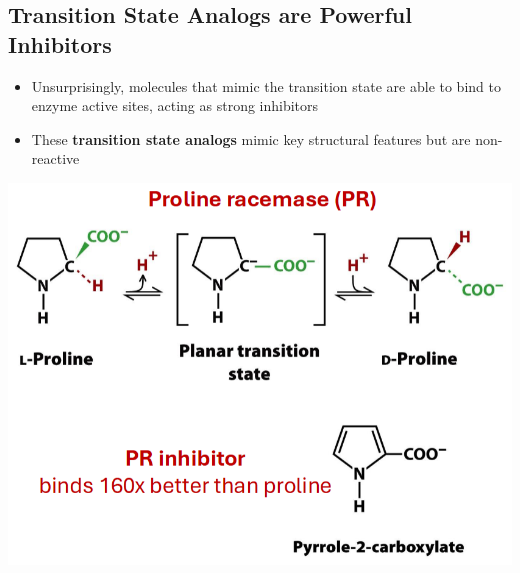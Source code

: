 \documentclass[10pt]{article}
\begin{document}
\subsection*{Transition State Analogs are Powerful Inhibitors}
\begin{itemize}
    \item Unsurprisingly, molecules that mimic the transition state are able to bind to enzyme active sites, acting as strong inhibitors
    \item These \textbf{transition state analogs} mimic key structural features but are non-reactive
\end{itemize}
\begin{center}
    \includegraphics*[scale=0.8]{L1_11.png}
\end{center}
\end{document}
